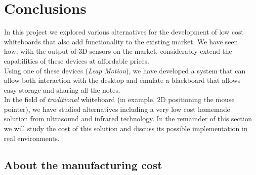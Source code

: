 \cleardoublepage

\chapter{Conclusions}
\label{apenddixE}

In this project we explored various alternatives for the development of low cost whiteboards that also add functionality to the existing market. We have seen how, with the output of 3D sensors on the market, considerably extend the capabilities of these devices at affordable prices.\\ 
Using one of these devices (\textit{Leap Motion}), we have developed a system that can allow both interaction with the desktop and emulate a blackboard that allows easy storage and sharing all the notes.\\ 
In the field of \textit{traditional} whiteboard (in example, 2D positioning the mouse pointer), we have studied alternatives including a very low cost homemade solution from ultrasound and infrared technology. In the remainder of this section we will study the cost of this solution and discuss its possible implementation in real environments.

\section{About the manufacturing cost}
\label{makereferenceE.1}

